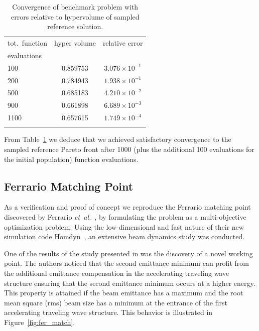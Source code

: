 \begin{table}[h!]
\begin{center}
  \caption{Convergence of benchmark problem with errors relative to
    hypervolume of sampled reference solution.}
  \label{tbl:bench_rms_error}
  \begin{tabular}{lcc}
    \hline\noalign{\smallskip}
    tot.\ function  & hyper volume & relative error\\
    evaluations    & & \\
    \noalign{\smallskip}\hline\noalign{\smallskip}
    100  &  0.859753 & $3.076 \times 10^{-1}$ \\
    \noalign{\smallskip}\hline\noalign{\smallskip}
    200  &  0.784943 & $1.938 \times 10^{-1}$ \\
    500  &  0.685183 & $4.210 \times 10^{-2}$ \\
    900  &  0.661898 & $6.689 \times 10^{-3}$ \\
    1100 &  0.657615 & $1.749 \times 10^{-4}$ \\
    \noalign{\smallskip}\hline
  \end{tabular}
\end{center}
\end{table}

From Table~\ref{tbl:bench_rms_error} we deduce that we achieved satisfactory
  convergence to the sampled reference Pareto front after 1000 (plus the
  additional 100 evaluations for the initial population) function evaluations.


\subsection{Ferrario Matching Point}\label{ferrario}

As a verification and proof of concept we reproduce the Ferrario
  matching point discovered by Ferrario \textit{et~al.}~\cite{fcpr:00},
  by formulating the problem as a  multi-objective optimization problem.
Using the low-dimensional and fast nature of their new simulation code
  Homdyn~\cite{homdyn}, an extensive beam dynamics study was conducted.

One of the results of the study presented in \cite{fcpr:00} was the discovery
  of a novel working point.
The authors noticed that the second emittance minimum can profit from the
  additional emittance compensation in the accelerating traveling wave
  structure ensuring that the second emittance minimum occurs at a higher
  energy.
This property is attained if the beam emittance has a maximum and the root
  mean square (rms) beam size has a minimum at the entrance of the first
  accelerating traveling wave structure.
This behavior is illustrated in Figure~\ref{fig:fer_match}.

